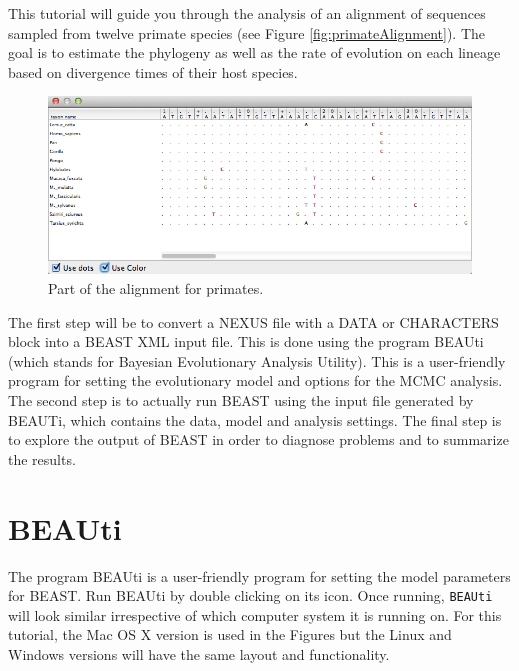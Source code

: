 \documentclass[11pt]{article}
\newcommand{\TODO}[1]{}
\theoremstyle{plain}%
\theoremstyle{definition}
\theoremstyle{remark}
\begin{document}
This tutorial will guide you through the analysis of an alignment of sequences sampled from twelve primate species (see Figure \ref{fig:primateAlignment}). The goal is to estimate the phylogeny as well as the rate of evolution on each lineage based on divergence times of their host species. 

\begin{figure}	

\includegraphics[width=\textwidth]{figures/AlignmentViewer.png}

\caption{Part of the alignment for primates.\label{fig:primateAlignment}}
\label{fig:BEAUti_ImportNexus}
\end{figure}

The first step will be to convert a NEXUS file with a DATA or CHARACTERS block into a BEAST XML input file. This is done using the program BEAUti (which stands for Bayesian Evolutionary Analysis Utility). 
This is a user-friendly program for setting the evolutionary model and options for the MCMC analysis. 
The second step is to actually run BEAST using the input file generated by BEAUTi,  which
contains the data, model and analysis settings. 
The final step is to explore the output of BEAST in order to diagnose problems and to summarize the results.

\section{BEAUti}

The program BEAUti is a user-friendly program for setting the
model parameters for BEAST. Run BEAUti by double clicking on its icon. Once running, \texttt{BEAUti} will look similar irrespective
of which computer system it is running on. For this tutorial, the Mac OS X version is used in the Figures but
the Linux and Windows versions will have the same layout and functionality.

\TODO{Provide instructions for executing BEAUti  in a Linux environment.}
\end{document}
